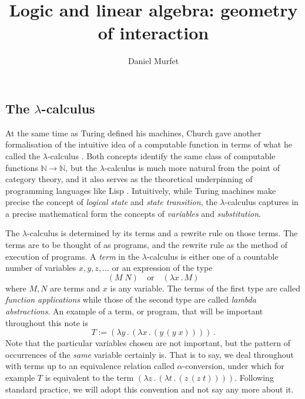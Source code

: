 \documentclass[english,letter paper,12pt,reqno]{article}
\theoremstyle{example}
\numberwithin{equation}{section}
\def\res{\operatorname{Res}}
\begin{document}
\def\ScoreOverhang{1pt}

\def\Res{\res\!}
\newcommand{\ud}[1]{\operatorname{d}\!{#1}}
\newcommand{\Ress}[1]{\res_{#1}\!}
\newcommand{\cat}[1]{\mathcal{#1}}
\newcommand{\lto}{\longrightarrow}
\newcommand{\xlto}[1]{\stackrel{#1}\lto}
\newcommand{\mf}[1]{\mathfrak{#1}}
\newcommand{\md}[1]{\mathscr{#1}}
\newcommand{\church}[1]{\underline{#1}}
\newcommand{\prf}[1]{\underline{#1}}
\newcommand{\den}[1]{\llbracket #1 \rrbracket}
\def\l{\,|\,}
\def\sgn{\textup{sgn}}
\def\cont{\operatorname{cont}}

\title{Logic and linear algebra: geometry of interaction}
\author{Daniel Murfet}

\maketitle

\subsection{The $\lambda$-calculus}\label{section:lambda_calc}

At the same time as Turing defined his machines, Church gave another formalisation of the intuitive idea of a computable function in terms of what he called the $\lambda$-calculus \cite{church,selinger}. Both concepts identify the same class of computable functions $\mathbb{N} \lto \mathbb{N}$, but the $\lambda$-calculus is much more natural from the point of category theory, and it also serves as the theoretical underpinning of programming languages like Lisp \cite{mccarthy}. Intuitively, while Turing machines make precise the concept of \emph{logical state} and \emph{state transition}, the $\lambda$-calculus captures in a precise mathematical form the concepts of \emph{variables} and \emph{substitution}. 

The $\lambda$-calculus is determined by its terms and a rewrite rule on those terms. The terms are to be thought of as programs, and the rewrite rule as the method of execution of programs. A \emph{term} in the $\lambda$-calculus is either one of a countable number of variables $x,y,z,\ldots$ or an expression of the type
\begin{equation}
(M \; N) \quad \text{or} \quad (\lambda x\,.\, M)
\end{equation}
where $M,N$ are terms and $x$ is any variable. The terms of the first type are called \emph{function applications} while those of the second type are called \emph{lambda abstractions}. An example of a term, or program, that will be important throughout this note is
\begin{equation}
T := ( \lambda y \,.\, ( \lambda x \,.\, (y \,(y \; x))))\,.
\end{equation}
Note that the particular variables chosen are not important, but the pattern of occurrences of the \emph{same} variable certainly is. That is to say, we deal throughout with terms up to an equivalence relation called $\alpha$-conversion, under which for example $T$ is equivalent to the term $( \lambda z \,.\, ( \lambda t \,.\, (z \,(z \; t))))$. Following standard practice, we will adopt this convention and not say any more about it.
\end{document}
